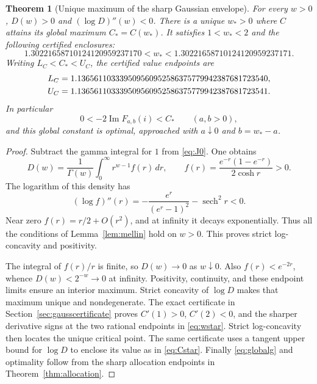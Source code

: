\documentclass[11pt,a4paper]{article}
\numberwithin{equation}{section}
\newtheorem{theorem}{Theorem}[section]
\theoremstyle{definition}
\theoremstyle{remark}
\renewcommand{\Im}{\operatorname{Im}}
\begin{document}
\begin{theorem}[Unique maximum of the sharp Gaussian envelope]
\label{thm:globalenvelope}
For every $w>0$, $D(w)>0$ and $(\log D)''(w)<0$. There is a unique
$w_*>0$ where $C$ attains its global maximum $C_*=C(w_*)$.
It satisfies $1<w_*<2$ and the following certified enclosures:
\begin{equation}
 1.30221658710124120959237170
 <w_*<1.30221658710124120959237171.\label{eq:wstar}
\end{equation}
Writing $L_C<C_*<U_C$, the certified value endpoints are
\begin{align}
 L_C&=1.136561103339509560952586375779942387681723540,\notag\\
 U_C&=1.136561103339509560952586375779942387681723541.
 \label{eq:Cstar}
\end{align}
In particular
\begin{equation}\label{eq:globalg}
 0<-2\Im F_{a,b}(i)<C_*\qquad(a,b>0),
\end{equation}
and this global constant is optimal, approached with $a\downarrow0$
and $b=w_*-a$.
\end{theorem}
\begin{proof}
Subtract the gamma integral for $1$ from \eqref{eq:J0}. One obtains
\begin{equation}\label{eq:Dmellin}
 D(w)=\frac1{\Gamma(w)}\int_0^\infty r^{w-1}f(r)\,dr,
 \qquad f(r)=\frac{e^{-r}(1-e^{-r})}{2\cosh r}>0.
\end{equation}
The logarithm of this density has
\begin{equation}\label{eq:logfcurvature}
 (\log f)''(r)=-\frac{e^r}{(e^r-1)^2}-\operatorname{sech}^2r<0.
\end{equation}
Near zero $f(r)=r/2+O(r^2)$, and at infinity it decays exponentially.
Thus all the conditions of Lemma~\ref{lem:mellin} hold on $w>0$.
This proves strict log-concavity and positivity.

The integral of $f(r)/r$ is finite, so $D(w)\to0$ as $w\downarrow0$.
Also $f(r)<e^{-2r}$, whence $D(w)<2^{-w}\to0$ at infinity. Positivity,
continuity, and these endpoint limits ensure an interior maximum.
Strict concavity of $\log D$ makes that maximum unique and nondegenerate.
The exact certificate in Section~\ref{sec:gausscertificate} proves
$C'(1)>0$, $C'(2)<0$, and the sharper derivative signs at the two
rational endpoints in \eqref{eq:wstar}. Strict log-concavity then
locates the unique critical point. The same certificate uses a tangent
upper bound for $\log D$ to enclose its value as in \eqref{eq:Cstar}.
Finally \eqref{eq:globalg} and optimality follow from the sharp allocation
endpoints in Theorem~\ref{thm:allocation}.
\end{proof}
\end{document}

